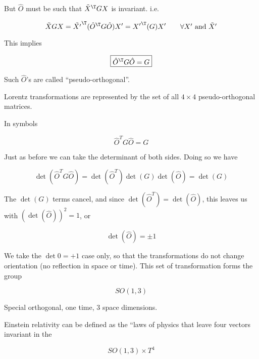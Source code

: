 But $\hat{O}$ must be such that $\tilde{X}^\T G X$ is invariant.  i.e.

\begin{equation}\label{eqn:relativisticElectrodynamicsL6:100}
\tilde{X} G X = {\tilde{X'}}^\T (\hat{O}^\T G \hat{O}) X' = {X'}^\T (G) X' \qquad \mbox{$\forall X'$ and $\tilde{X}'$}
\end{equation}

This implies

\begin{equation}\label{eqn:relativisticElectrodynamicsL6:110}
\boxed{\hat{O}^\T G \hat{O} = G}
\end{equation}

Such $\hat{O}$'s are called ``pseudo-orthogonal''.

Lorentz transformations are represented by the set of all $4 \times 4$ pseudo-orthogonal matrices.

In symbols

\begin{equation}\label{eqn:relativisticElectrodynamicsL6:120}
\hat{O}^T G \hat{O} = G
\end{equation}

Just as before we can take the determinant of both sides.  Doing so we have

\begin{equation}\label{eqn:relativisticElectrodynamicsL6:130}
\det(\hat{O}^T G \hat{O}) = \det(\hat{O}^T) \det(G) \det(\hat{O}) = \det(G)
\end{equation}

The $\det(G)$ terms cancel, and since $\det(\hat{O}^T) = \det(\hat{O})$, this leaves us with $(\det(\hat{O}))^2 = 1$, or

\begin{equation}\label{eqn:relativisticElectrodynamicsL6:140}
\det(\hat{O}) = \pm 1
\end{equation}

We take the $\det 0 = +1$ case only, so that the transformations do not change orientation (no reflection in space or time).  This set of transformation forms the group

\begin{equation*}
SO(1,3)
\end{equation*}

Special orthogonal, one time, 3 space dimensions.

Einstein relativity can be defined as the ``laws of physics that leave four vectors invariant in the

\begin{equation*}
SO(1,3) \times T^4
\end{equation*}

